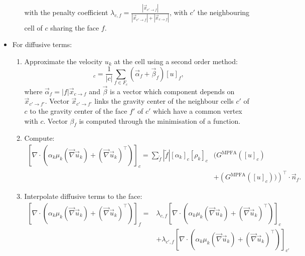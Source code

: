 \begin{itemize}
\begin{enumerate}
    with the penalty coefficient $\lambda_{c,f} = \frac{ |\vec{x}_{c' \rightarrow f}|}{|\vec{x}_{c' \rightarrow f}| + |\vec{x}_{c \rightarrow f}|}$, with $c'$ the neighbouring cell of $c$ sharing the face $f$.
  \end{enumerate}
\item For diffusive terms:
  \begin{enumerate}
  \item Approximate the velocity $u_k$ at the cell using a second order method:
    \begin{equation}
      [\vec{u}]_c = \frac{1}{|c|} \sum _{f \in F_c}  (\vec{\alpha} _f + \vec{\beta} _f)[u]_f ,
    \end{equation}
    where $\vec{\alpha}_f = |f| \vec{x}_{c \rightarrow f}$ and $\vec{\beta}$ is a vector which component depends on $\vec{x}_{c' \rightarrow f'}$. Vector $\vec{x}_{c' \rightarrow f'}$ links the gravity center of the neighbour cells $c'$ of $c$ to the gravity center of the face $f'$ of $c'$ which have a common vertex with $c$. Vector $\beta_f$ is computed through the minimisation of a function.
  \item Compute:
    \begin{equation}
    \begin{aligned}
      [\nabla \cdot (\alpha_k \mu _k (\vec{\nabla} \vec{u}_k) + (\vec{\nabla} \vec{u}_k)^\intercal) ]_c = \sum_{\tilde{f}} |\tilde{f}| [\alpha_k]_c [\rho_k]_c & (G^{\text{MPFA}} ([u]_c) \\ &+ \left(G^{\text{MPFA}} ([u]_c))\right) ^\intercal \cdot \vec{n}_f.
    \end{aligned}
    \end{equation}
    
  \item Interpolate diffusive terms to the face:
    \begin{equation}
      \begin{split}
        [\nabla \cdot (\alpha_k \mu _k (\vec{\nabla} \vec{u}_k) + (\vec{\nabla} \vec{u}_k)^\intercal) ]_f =&  \lambda_{c,f}  [\nabla \cdot (\alpha_k \mu _k (\vec{\nabla} \vec{u}_k) + (\vec{\nabla} \vec{u}_k)^\intercal) ]_c \\ &+ \lambda_{c',f}  [\nabla \cdot (\alpha_k \mu _k (\vec{\nabla} \vec{u}_k) + (\vec{\nabla} \vec{u}_k)^\intercal) ]_{c'}
      \end{split}
    \end{equation}
  \end{enumerate}
\end{itemize}


